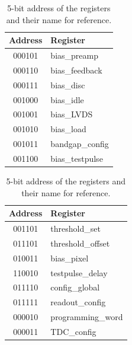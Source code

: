 		\begin{table}[h!]
			\centering
			\begin{minipage}[t]{0.48\textwidth}
			\centering
				\begin{tabular}{|c|l|}
					\hline
					\textbf{Address} & \textbf{Register} \\ \hline
					000101 & bias\_preamp \\ \hline
					000110 & bias\_feedback \\ \hline
					000111 & bias\_disc \\ \hline
					001000 & bias\_idle \\ \hline
					001001 & bias\_LVDS \\ \hline
					001010 & bias\_load \\ \hline
					001011 & bandgap\_config \\ \hline
					001100 & bias\_testpulse \\ \hline
				\end{tabular}
			\end{minipage}
			\hfill
			\begin{minipage}[t]{0.48\textwidth}
			\centering
				\begin{tabular}{|c|l|}
					\hline
					\textbf{Address} & \textbf{Register} \\ \hline
					001101 & threshold\_set \\ \hline
					011101 & threshold\_offset \\ \hline
					010011 & bias\_pixel \\ \hline
					110010 & testpulse\_delay \\ \hline
					011110 & config\_global \\ \hline
					011111 & readout\_config \\ \hline
					000010 & programming\_word \\ \hline
					000011 & TDC\_config \\ \hline
				\end{tabular}
			\end{minipage}

			\caption{5-bit address of the registers and their name for reference.}
			\label{tab:SPI_parameters}
		\end{table}
		
